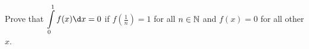 \begin{problem}
  Prove that $\displaystyle \int\limits_0^1 f(x) \d x = 0$ if $f(\frac{1}{n})= 1$ for all $n \in \mathbb{N}$
  and $f(x) = 0$ for all other $x$.
\end{problem}

\begin{answer}

\end{answer}
